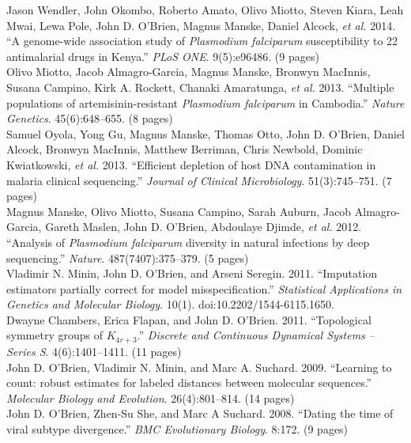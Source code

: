 \documentclass[10pt]{article}
\begin{document}
Jason Wendler, John Okombo, Roberto Amato, Olivo Miotto, Steven Kiara, Leah Mwai, Lewa Pole, John D. O'Brien, Magnus Manske, Daniel Alcock, \emph{et al.} 2014. ``A genome-wide association study of \emph{Plasmodium falciparum} susceptibility to 22 antimalarial drugs in Kenya.'' \emph{PLoS ONE}. 9(5):e96486. (9 pages)\\

Olivo Miotto, Jacob Almagro-Garcia, Magnus Manske, Bronwyn MacInnis, Susana Campino, Kirk A. Rockett, Chanaki Amaratunga, \emph{et al.} 2013. ``Multiple populations of artemisinin-resistant \emph{Plasmodium falciparum} in Cambodia.'' \emph{Nature Genetics}. 45(6):648--655. (8 pages) \\

Samuel Oyola, Yong Gu, Magnus Manske, Thomas Otto, John D. O'Brien, Daniel Alcock, Bronwyn MacInnis, Matthew Berriman, Chris Newbold, Dominic Kwiatkowski, \emph{et al.} 2013. ``Efficient depletion of host DNA contamination in malaria clinical sequencing.'' \emph{Journal of Clinical Microbiology}. 51(3):745--751. (7 pages) \\

Magnus Manske, Olivo Miotto, Susana Campino, Sarah Auburn, Jacob Almagro-Garcia, Gareth Maslen, John D. O'Brien, Abdoulaye Djimde, \emph{et al.} 2012. ``Analysis of \emph{Plasmodium falciparum} diversity in natural infections by deep sequencing.'' \emph{Nature}. 487(7407):375--379. (5 pages) \\

Vladimir N. Minin, John D. O'Brien, and Arseni Seregin. 2011. ``Imputation estimators partially correct for model misspecification.'' \emph{Statistical Applications in Genetics and Molecular Biology}. 10(1). doi:10.2202/1544-6115.1650.\\

Dwayne Chambers, Erica Flapan, and John D. O'Brien. 2011. ``Topological symmetry groups of $K_{4r+3}$.'' \emph{Discrete and Continuous Dynamical Systems -- Series S}. 4(6):1401--1411. (11 pages)\\

John D. O'Brien, Vladimir N. Minin, and Marc A. Suchard. 2009. ``Learning to count: robust estimates for labeled distances between molecular sequences.'' \emph{Molecular Biology and Evolution}. 26(4):801--814. (14 pages)  \\

John D. O'Brien, Zhen-Su She, and Marc A Suchard. 2008. ``Dating the time of viral subtype divergence.'' \emph{BMC Evolutionary Biology}. 8:172. (9 pages) \\
\end{document}
